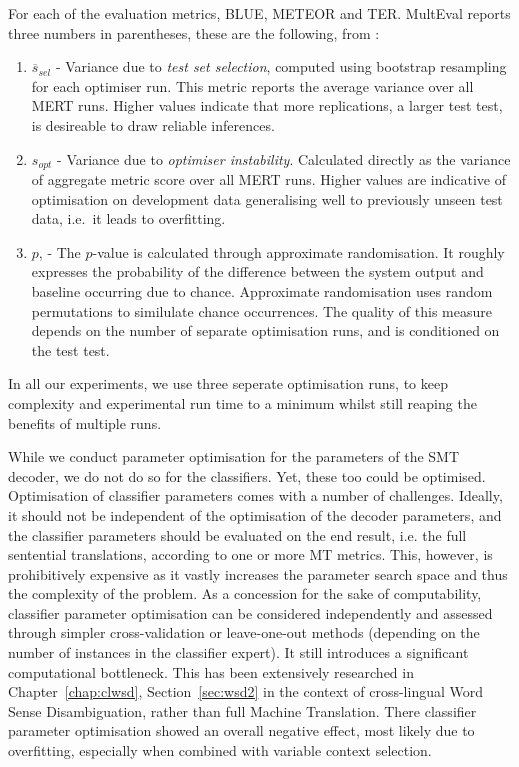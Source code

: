 For each of the evaluation metrics, BLUE, METEOR and TER. MultEval reports
three numbers in parentheses, these are the following, from \cite{MERTCONTROL}:

\begin{enumerate}
\item $\overline{s}_{sel}$ - Variance due to \emph{test set selection},
computed using bootstrap resampling for each optimiser run. This metric reports
the average variance over all MERT runs. Higher values indicate that more
replications, a larger test test, is desireable to draw reliable inferences.
\item $s_{opt}$ - Variance due to \emph{optimiser instability}. Calculated
directly as the variance of aggregate metric score over all MERT runs. Higher
values are indicative of optimisation on development data generalising well to
previously unseen test data, i.e.\ it leads to overfitting.
\item $p$, - The $p$-value is calculated through approximate randomisation. It roughly
expresses the probability of the difference between the system output and
baseline occurring due to chance. Approximate randomisation uses random
permutations to similulate chance occurrences. The quality of this measure depends on the number of separate
optimisation runs, and is conditioned on the test test.
\end{enumerate}

In all our experiments, we use three seperate optimisation runs, to keep
complexity and experimental run time to a minimum whilst still reaping the
benefits of multiple runs.

While we conduct parameter optimisation for the parameters of the SMT
decoder, we do not do so for the classifiers. Yet, these too could
be optimised. Optimisation of classifier parameters comes with a number of challenges.
Ideally, it should not be independent of the optimisation of the decoder
parameters, and the classifier parameters should be evaluated on the
end result, i.e. the full sentential translations, according to one or more MT
metrics. This, however, is prohibitively expensive as it vastly increases the
parameter search space and thus the complexity of the problem. As a concession
for the sake of computability, classifier parameter optimisation can be considered
independently and assessed through simpler cross-validation or leave-one-out
methods (depending on the number of instances in the classifier expert).  It
still introduces a significant computational bottleneck.
This has been extensively researched in Chapter~\ref{chap:clwsd}, Section~\ref{sec:wsd2} in
the context of cross-lingual Word Sense Disambiguation, rather than full
Machine Translation. There classifier parameter optimisation showed an
overall negative effect, most likely due to overfitting, especially when
combined with variable context selection.

